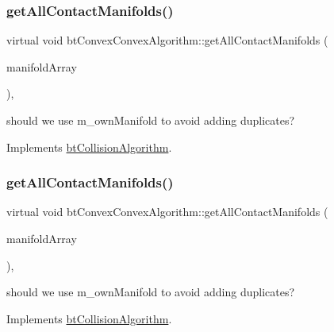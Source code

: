 \subsubsection{\texorpdfstring{get\+All\+Contact\+Manifolds()}{getAllContactManifolds()}\hspace{0.1cm}{\footnotesize\ttfamily [1/2]}}
{\footnotesize\ttfamily virtual void bt\+Convex\+Convex\+Algorithm\+::get\+All\+Contact\+Manifolds (\begin{DoxyParamCaption}\item[{\hyperlink{classbtAlignedObjectArray}{bt\+Manifold\+Array} \&}]{manifold\+Array }\end{DoxyParamCaption})\hspace{0.3cm}{\ttfamily [inline]}, {\ttfamily [virtual]}}

should we use m\+\_\+own\+Manifold to avoid adding duplicates? 

Implements \hyperlink{classbtCollisionAlgorithm}{bt\+Collision\+Algorithm}.

\mbox{\label{classbtConvexConvexAlgorithm_aa2a195cdd3b45c169c15ea2de85c4038}} 
\subsubsection{\texorpdfstring{get\+All\+Contact\+Manifolds()}{getAllContactManifolds()}\hspace{0.1cm}{\footnotesize\ttfamily [2/2]}}
{\footnotesize\ttfamily virtual void bt\+Convex\+Convex\+Algorithm\+::get\+All\+Contact\+Manifolds (\begin{DoxyParamCaption}\item[{\hyperlink{classbtAlignedObjectArray}{bt\+Manifold\+Array} \&}]{manifold\+Array }\end{DoxyParamCaption})\hspace{0.3cm}{\ttfamily [inline]}, {\ttfamily [virtual]}}

should we use m\+\_\+own\+Manifold to avoid adding duplicates? 

Implements \hyperlink{classbtCollisionAlgorithm}{bt\+Collision\+Algorithm}.

\mbox{\label{classbtConvexConvexAlgorithm_ab566631355a17f7a4bcbddf9454eb9e5}} 
